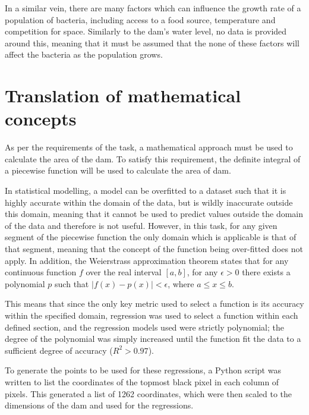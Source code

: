 \documentclass{article}
\begin{document}
    In a similar vein, there are many factors which can influence the growth rate of a population of bacteria, including access to a food source, temperature and competition for space. Similarly to the dam's water level, no data is provided around this, meaning that it must be assumed that the none of these factors will affect the bacteria as the population grows.
    
\section{Translation of mathematical concepts}

    As per the requirements of the task, a mathematical approach must be used to calculate the area of the dam. To satisfy this requirement, the definite integral of a piecewise function will be used to calculate the area of dam.

    In statistical modelling, a model can be overfitted to a dataset such that it is highly accurate within the domain of the data, but is wildly inaccurate outside this domain, meaning that it cannot be used to predict values outside the domain of the data and therefore is not useful. However, in this task, for any given segment of the piecewise function the only domain which is applicable is that of that segment, meaning that the concept of the function being over-fitted does not apply. In addition, the Weierstrass approximation theorem states that for any continuous function $f$ over the real interval $[a, b]$, for any $\epsilon > 0$ there exists a polynomial $p$ such that $|f(x) - p(x)| < \epsilon$, where $a \leq x \leq b$.
 
    This means that since the only key metric used to select a function is its accuracy within the specified domain, regression was used to select a function within each defined section, and the regression models used were strictly polynomial; the degree of the polynomial was simply increased until the function fit the data to a sufficient degree of accuracy ($R^2 > 0.97$).

    To generate the points to be used for these regressions, a Python script was written to list the coordinates of the topmost black pixel in each column of pixels. This generated a list of 1262 coordinates, which were then scaled to the dimensions of the dam and used for the regressions.

    \begin{figure}
        \centering
    \end{figure}
\end{document}
